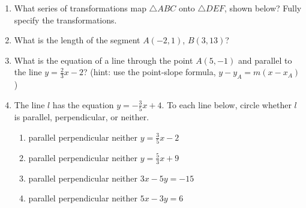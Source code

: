 \documentclass[12pt, twoside]{article}
\begin{document}
\begin{enumerate}
  \item What series of transformations map $\triangle ABC$ onto $\triangle DEF$, shown below? Fully specify the transformations.
    \begin{center}
    \end{center}
\vspace{2cm}

\newpage

  \item What is the length of the segment $A(-2,1)$, $B(3,13)$?
    \vspace{6cm}

  \item What is the equation of a line through the point $A(5,-1)$ and parallel to the line $y=\frac{2}{3}x-2$? (hint: use the point-slope formula, $y-y_A=m (x-x_A)$) \vspace{2.5cm}


  \item The line $l$ has the equation $y=-\frac{3}{5}x+4$. To each line below, circle whether $l$ is parallel, perpendicular, or neither.
    \begin{enumerate}
      \item parallel \quad perpendicular \quad neither \qquad $y=\frac{3}{5}x-2$
      \vspace{0.5cm}
      \item parallel \quad perpendicular \quad neither \qquad $y=\frac{5}{3}x+9$
      \vspace{0.5cm}
      \item parallel \quad perpendicular \quad neither \qquad $3x-5y=-15$
      \vspace{2cm}
      \item parallel \quad perpendicular \quad neither \qquad $5x-3y=6$
      \vspace{1.7cm}
    \end{enumerate}


\end{enumerate}
\end{document}
